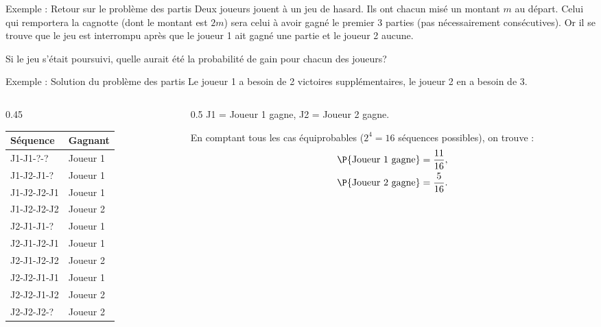 \documentclass[nuit,charter,pied,handout]{BeamerJS}
\begin{document}
\begin{frame}{Exemple : Retour sur le problème des partis}
	Deux joueurs jouent à un jeu de hasard. Ils ont chacun misé un montant $m$ au départ. Celui qui remportera la cagnotte (dont le montant est $2m$) sera celui à avoir gagné le premier 3 parties (pas nécessairement consécutives). Or il se trouve que le jeu est interrompu après que le joueur 1 ait gagné une partie et le joueur 2 aucune.
	\pause
	\begin{cadre}
	Si le jeu s'était poursuivi, quelle aurait été la probabilité de gain pour chacun des joueurs?
	\end{cadre}
\end{frame}

\begin{frame}{Exemple : Solution du problème des partis}
Le joueur 1 a besoin de 2 victoires supplémentaires, le joueur 2 en a besoin de 3.
\pause

\begin{columns}[T,onlytextwidth]
\begin{column}{0.45\linewidth}
{\small
\begin{tabular}{|l|l|}
\hline
\textbf{Séquence} & \textbf{Gagnant} \\ \hline
J1-J1-?-? & Joueur 1 \\
J1-J2-J1-? & Joueur 1 \\
J1-J2-J2-J1 & Joueur 1 \\
J1-J2-J2-J2 & Joueur 2 \\
J2-J1-J1-? & Joueur 1 \\
J2-J1-J2-J1 & Joueur 1 \\
J2-J1-J2-J2 & Joueur 2 \\
J2-J2-J1-J1 & Joueur 1 \\
J2-J2-J1-J2 & Joueur 2 \\
J2-J2-J2-? & Joueur 2 \\ \hline
\end{tabular}
}
\end{column}
\begin{column}{0.5\linewidth}
 J1 = Joueur 1 gagne, J2 = Joueur 2 gagne.

\pause
\medskip
En comptant tous les cas équiprobables (\(2^4 = 16\) séquences possibles), on trouve :
\begin{align*}
\P{\text{Joueur 1 gagne}} &= \frac{11}{16},\\
\P{\text{Joueur 2 gagne}} &= \frac{5}{16}.
\end{align*}
\end{column}
\end{columns}
\end{frame}
\end{document}
